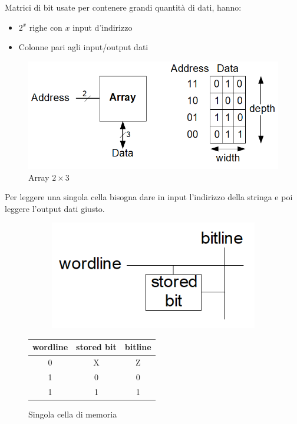 \documentclass{article}
\begin{document}
Matrici di bit usate per contenere grandi quantità di dati, hanno:
\begin{itemize}
    \item $2^x$ righe con $x$ input d'indirizzo
    \item Colonne pari agli input/output dati
\end{itemize}

\begin{figure}[ht]
    \centering
    \includegraphics[width=0.65\linewidth]{mem_array.png}
    \caption{Array $2\times 3$}
    \label{fig:mem_array}
\end{figure}

Per leggere una singola cella bisogna dare in input l'indirizzo della stringa e poi leggere l'output dati giusto.

\begin{figure}[ht]
    \begin{minipage}[t]{0.49\textwidth}
    \begin{figure}[H]
        \centering
        \includegraphics[width=0.6\linewidth]{mem_cell.png}
        \label{fig:mem_cell}
    \end{figure}
    \end{minipage}
    \begin{minipage}[t]{0.49\textwidth}
    \centering
        \begin{table}[H]
        \centering
        \begin{tabular}{cc|c}
            wordline & stored bit & bitline\\
            \hline
            0 & X & Z\\
            1 & 0 & 0\\
            1 & 1 & 1\\
        \end{tabular}
    \label{tab:mem_cell}
    \end{table}
\end{minipage}
\caption{Singola cella di memoria}
\end{figure}
\end{document}
